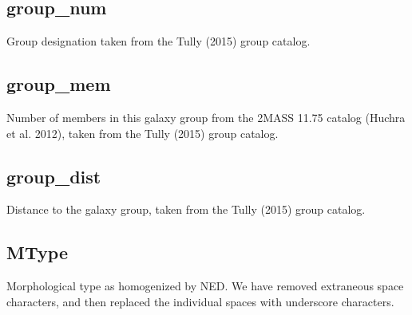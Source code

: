\documentclass[iop]{emulateapj-rtx4}
\begin{document}
\subsection{group\_num}
Group designation taken from the Tully (2015) group catalog.

\subsection{group\_mem}
Number of members in this galaxy group from the 2MASS 11.75 catalog (Huchra et al. 2012), taken from the Tully (2015) group catalog.

\subsection{group\_dist}
Distance to the galaxy group, taken from the Tully (2015) group catalog.

\subsection{MType}
Morphological type as homogenized by NED. We have removed extraneous space characters, and then replaced the individual spaces with underscore characters.
\end{document}
